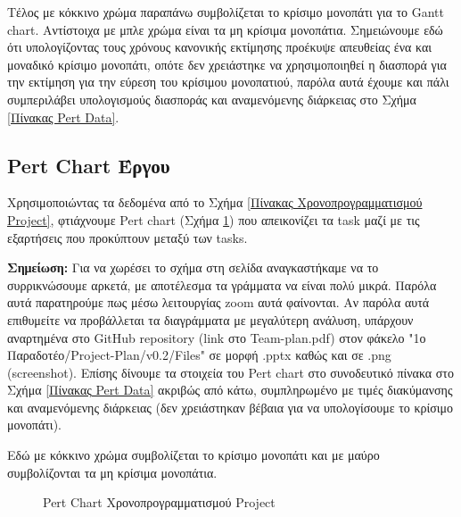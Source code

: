 \documentclass[12pt,a4paper]{article}
\begin{document}
Τέλος με κόκκινο χρώμα παραπάνω συμβολίζεται το κρίσιμο μονοπάτι για το Gantt chart. Αντίστοιχα με μπλε χρώμα είναι τα μη κρίσιμα μονοπάτια. Σημειώνουμε εδώ ότι υπολογίζοντας τους χρόνους κανονικής εκτίμησης προέκυψε απευθείας ένα και μοναδικό κρίσιμο μονοπάτι, οπότε δεν χρειάστηκε να χρησιμοποιηθεί η διασπορά για την εκτίμηση για την εύρεση του κρίσιμου μονοπατιού, παρόλα αυτά έχουμε και πάλι συμπεριλάβει υπολογισμούς διασποράς και αναμενόμενης διάρκειας στο Σχήμα \ref{Πίνακας Pert Data}.

\subsection{Pert Chart Έργου}
\label{Ενότητα Pert Chart Έργου}

Χρησιμοποιώντας τα δεδομένα από το Σχήμα \ref{Πίνακας Χρονοπρογραμματισμού Project}, φτιάχνουμε Pert chart (Σχήμα \ref{Pert Chart Χρονοπρογραμματισμού Project}) που απεικονίζει τα task μαζί με τις εξαρτήσεις που προκύπτουν μεταξύ των tasks.

\textbf{Σημείωση:} Για να χωρέσει το σχήμα στη σελίδα αναγκαστήκαμε να το συρρικνώσουμε αρκετά, με αποτέλεσμα τα γράμματα να είναι πολύ μικρά. Παρόλα αυτά παρατηρούμε πως μέσω λειτουργίας zoom αυτά φαίνονται. Αν παρόλα αυτά επιθυμείτε να προβάλλεται τα διαγράμματα με μεγαλύτερη ανάλυση, υπάρχουν αναρτημένα στο GitHub repository (link στο Team-plan.pdf) στον φάκελο "1ο Παραδοτέο/Project-Plan/v0.2/Files" σε μορφή .pptx καθώς και σε .png (screenshot). Επίσης δίνουμε τα στοιχεία του Pert chart στο συνοδευτικό πίνακα στο Σχήμα \ref{Πίνακας Pert Data} ακριβώς από κάτω, συμπληρωμένο με τιμές διακύμανσης και αναμενόμενης διάρκειας (δεν χρειάστηκαν βέβαια για να υπολογίσουμε το κρίσιμο μονοπάτι).

Εδώ με κόκκινο χρώμα συμβολίζεται το κρίσιμο μονοπάτι και με μαύρο συμβολίζονται τα μη κρίσιμα μονοπάτια.

\begin{figure}[H]
	\caption{Pert Chart Χρονοπρογραμματισμού Project}
	\label{Pert Chart Χρονοπρογραμματισμού Project}
\end{figure}
\end{document}
